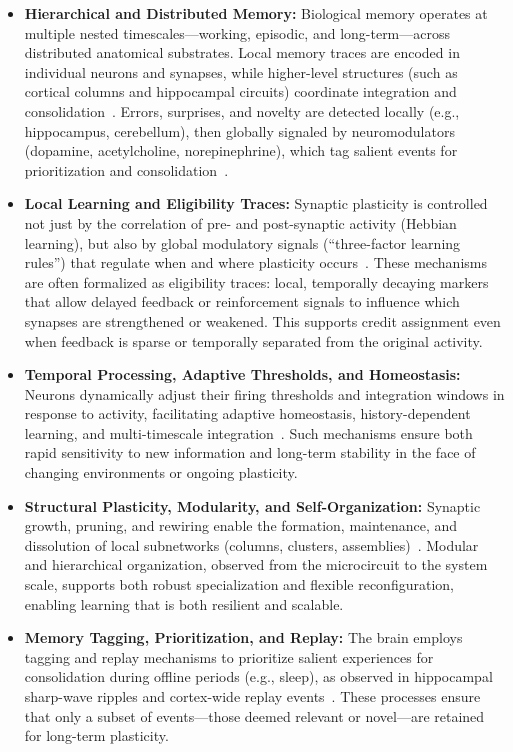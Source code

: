 \documentclass[11pt]{article}
\begin{document}
\begin{itemize}
    \item \textbf{Hierarchical and Distributed Memory:} Biological memory operates at multiple nested timescales—working, episodic, and long-term—across distributed anatomical substrates. Local memory traces are encoded in individual neurons and synapses, while higher-level structures (such as cortical columns and hippocampal circuits) coordinate integration and consolidation~\cite{Lisman2020, Buzsaki2019}. Errors, surprises, and novelty are detected locally (e.g., hippocampus, cerebellum), then globally signaled by neuromodulators (dopamine, acetylcholine, norepinephrine), which tag salient events for prioritization and consolidation~\cite{Sara2009, Doya2000, Shohamy2008}.

    \item \textbf{Local Learning and Eligibility Traces:} Synaptic plasticity is controlled not just by the correlation of pre- and post-synaptic activity (Hebbian learning), but also by global modulatory signals (“three-factor learning rules”) that regulate when and where plasticity occurs~\cite{Gerstner2018, Yagishita2014, Frémaux2016}. These mechanisms are often formalized as eligibility traces: local, temporally decaying markers that allow delayed feedback or reinforcement signals to influence which synapses are strengthened or weakened. This supports credit assignment even when feedback is sparse or temporally separated from the original activity.

    \item \textbf{Temporal Processing, Adaptive Thresholds, and Homeostasis:} Neurons dynamically adjust their firing thresholds and integration windows in response to activity, facilitating adaptive homeostasis, history-dependent learning, and multi-timescale integration~\cite{Pozzorini2013, Fusi2005, Turrigiano2012}. Such mechanisms ensure both rapid sensitivity to new information and long-term stability in the face of changing environments or ongoing plasticity.

    \item \textbf{Structural Plasticity, Modularity, and Self-Organization:} Synaptic growth, pruning, and rewiring enable the formation, maintenance, and dissolution of local subnetworks (columns, clusters, assemblies)~\cite{Holtmaat2009, Perin2011, Sporns2016}. Modular and hierarchical organization, observed from the microcircuit to the system scale, supports both robust specialization and flexible reconfiguration, enabling learning that is both resilient and scalable.

    \item \textbf{Memory Tagging, Prioritization, and Replay:} The brain employs tagging and replay mechanisms to prioritize salient experiences for consolidation during offline periods (e.g., sleep), as observed in hippocampal sharp-wave ripples and cortex-wide replay events~\cite{Carr2011, Girardeau2014, McClelland1995}. These processes ensure that only a subset of events—those deemed relevant or novel—are retained for long-term plasticity.
\end{itemize}
\end{document}
